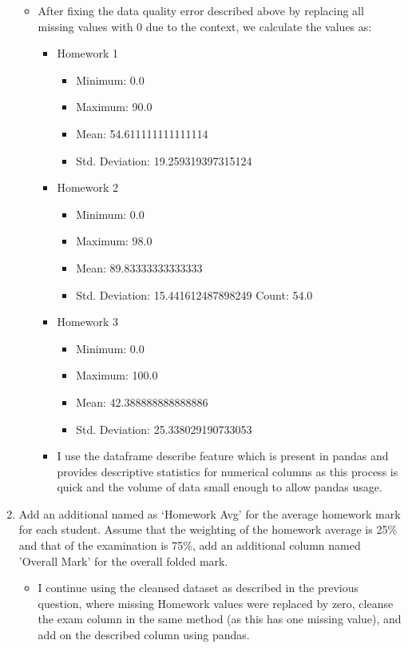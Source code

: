 \documentclass{scrreprt}
\begin{document}
\begin{enumerate}
\begin{itemize}
\item After fixing the data quality error described above by replacing all missing values with 0 due to the context, we calculate the values as:
\begin{itemize}
	\item Homework 1 \begin{itemize}
\item Minimum: 0.0
\item Maximum: 90.0
\item Mean: 54.611111111111114
\item Std. Deviation: 19.259319397315124
	\end{itemize}
	\item Homework 2
	\begin{itemize}
  \item Minimum: 0.0
\item Maximum: 98.0
\item Mean: 89.83333333333333
\item  Std. Deviation: 15.441612487898249
Count: 54.0
	\end{itemize}
	\item Homework 3
	\begin{itemize}
\item Minimum: 0.0
\item Maximum: 100.0
\item Mean: 42.388888888888886
\item Std. Deviation: 25.338029190733053
	\end{itemize}

\item I use the dataframe describe feature which is present in pandas and provides descriptive statistics for numerical columns as this process is quick and the volume of data small enough to allow pandas usage.
\end{itemize}
\end{itemize}
\item Add an additional named as ‘Homework Avg’ for the average homework mark for each student. Assume that the weighting of the homework average is 25\% and that of the examination is 75\%, add an additional column named 'Overall Mark' for the overall folded mark.

\begin{itemize}
	\item I continue using the cleansed dataset as described in the previous question, where missing Homework values were replaced by zero, cleanse the exam column in the same method (as this has one missing value), and add on the described column using pandas.
\end{itemize}


\end{enumerate}
\end{document}
